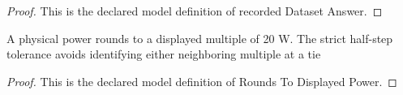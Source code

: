 \begin{proof}
  This is the declared model definition of recorded Dataset Answer.
\end{proof}
\begin{definition}
  \label{def:physics:phyx-mini-0695:phyxminiproblems-problemphyxmini0695-roundstodisplayedpower}
  A physical power rounds to a displayed multiple of 20 W. The strict half-step tolerance avoids identifying either neighboring multiple at a tie
\end{definition}
\begin{proof}
  This is the declared model definition of Rounds To Displayed Power.
\end{proof}
